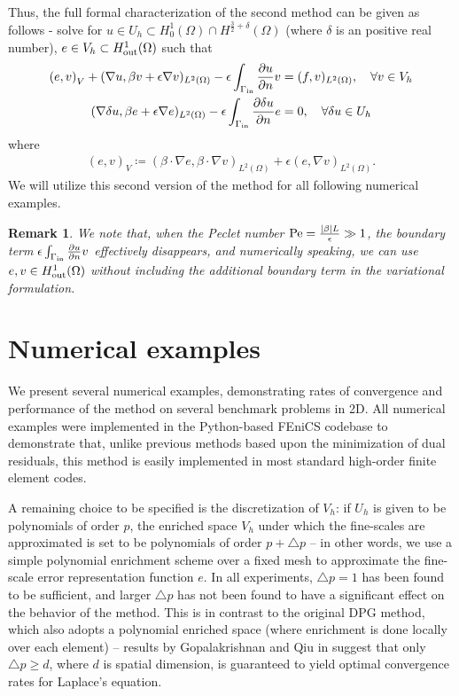 \documentclass[final,leqno]{siamltex}
\newcommand{\LRp}[1]{\left( #1 \right)}
\newcommand{\LRc}[1]{\left\{ #1 \right\}}
\newcommand{\LRb}[1]{\left| #1 \right|}
\newcommand{\Grad} {\ensuremath{\nabla}}
\renewcommand{\L}{L^2\LRp{\Omega}}
\newcommand{\pd}[2]{\frac{\partial#1}{\partial#2}}
\newtheorem{remark}{Remark}
\begin{document}
Thus, the full formal characterization of the second method can be given as follows - solve for $u\in U_h \subset H^1_0(\Omega)\cap H^{\frac{3}{2}+\delta}(\Omega)$ (where $\delta$ is an positive real number), $e\in V_h\subset H^1_{\rm out}(\Omega)$ such that
\begin{align*}
\LRp{e,v}_V + (\Grad u, \beta v + \epsilon \Grad v)_{\L} - \epsilon\int_{\Gamma_{\rm in}} \pd{u}{n}v &= (f,v)_{\L}, \quad \forall v \in V_h\\
(\Grad \delta u, \beta e + \epsilon \Grad e)_{\L} - \epsilon\int_{\Gamma_{\rm in}} \pd{\delta u}{n}e &= 0, \quad \forall \delta u \in U_h
\end{align*}
where
\begin{align*}
\LRp{e,v}_V \coloneqq \LRp{\beta\cdot \Grad e,\beta\cdot \Grad v}_{\L} + \epsilon \LRp{e,\Grad v}_{\L}.
\end{align*}
We will utilize this second version of the method for all following numerical examples.  


\begin{remark}
We note that, when the Peclet number ${\rm Pe} = \frac{\LRb{\beta} L}{\epsilon} \gg 1$, the boundary term $\epsilon\int_{\Gamma_{\rm in}} \pd{u}{n}v$ effectively disappears, and numerically speaking, we can use $e,v\in H^1_{\rm out}(\Omega)$ without including the additional boundary term in the variational formulation.  
\end{remark}

\section{Numerical examples}

We present several numerical examples, demonstrating rates of convergence and performance of the method on several benchmark problems in 2D.  All numerical examples were implemented in the Python-based FEniCS codebase \cite{LoggMardalEtAl2012a} to demonstrate that, unlike previous methods based upon the minimization of dual residuals, this method is easily implemented in most standard high-order finite element codes.  

A remaining choice to be specified is the discretization of $V_h$: if $U_h$ is given to be polynomials of order $p$, the enriched space $V_h$ under which the fine-scales are approximated is set to be polynomials of order $p+\triangle p$ -- in other words, we use a simple polynomial enrichment scheme over a fixed mesh to approximate the fine-scale error representation function $e$.  In all experiments, $\triangle p = 1$ has been found to be sufficient, and larger $\triangle p$ has not been found to have a significant effect on the behavior of the method.  This is in contrast to the original DPG method, which also adopts a polynomial enriched space (where enrichment is done locally over each element) -- results by Gopalakrishnan and Qiu in \cite{practicalDPG} suggest that only $\triangle p \geq d$, where $d$ is spatial dimension, is guaranteed to yield optimal convergence rates for Laplace's equation.  
\end{document}
